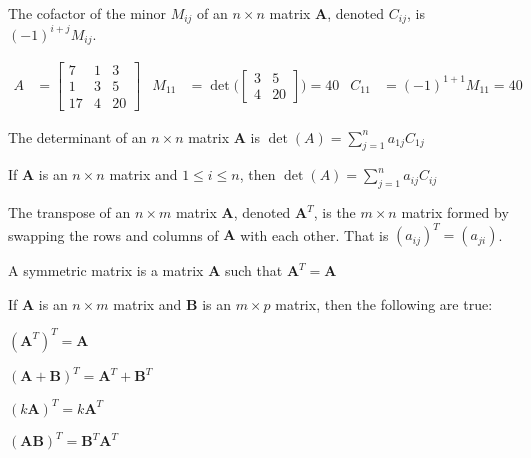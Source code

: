     \begin{definition}
        The cofactor of the minor $M_{ij}$ of an
        ${n}\times{n}$ matrix $\mathbf{A}$,
        denoted $C_{ij}$, is $(-1)^{i+j}M_{ij}$.
    \end{definition}
    \begin{example}
        \begin{align*}
            A&=
            \begin{bmatrix}
                7&1&3\\
                1&3&5\\
                17&4&20
            \end{bmatrix}
            &
            M_{11}
            &=
            \det\Bigg(\begin{bmatrix}
                     3&5\\
                     4&20
                 \end{bmatrix}
                \Bigg)
            =40
            &
            C_{11}
            &=(-1)^{1+1}M_{11}=40
        \end{align*}
    \end{example}
    \begin{definition}
        The determinant of an ${n}\times{n}$ matrix
        $\mathbf{A}$ is
        $\det(A)=\sum_{j=1}^{n}a_{1j}C_{1j}$
    \end{definition}
    \begin{theorem}
        If $\mathbf{A}$ is an ${n}\times{n}$ matrix
        and ${1}\leq{i}\leq{n}$, then
        $\det(A)=\sum_{j=1}^{n}a_{ij}C_{ij}$
    \end{theorem}
    \begin{definition}
        The transpose of an ${n}\times{m}$ matrix
        $\mathbf{A}$, denoted $\mathbf{A}^{T}$,
        is the ${m}\times{n}$ matrix formed by
        swapping the rows and columns of $\mathbf{A}$
        with each other. That is $(a_{ij})^{T}=(a_{ji})$.
    \end{definition}
    \begin{definition}
        A symmetric matrix is a matrix $\mathbf{A}$
        such that $\mathbf{A}^{T}=\mathbf{A}$
    \end{definition}
    \begin{theorem}
        If $\mathbf{A}$ is an ${n}\times{m}$ matrix and
        $\mathbf{B}$ is an ${m}\times{p}$ matrix, then
        the following are true:
        \begin{enumerate}
            \begin{multicols}{2}
                \item $(\mathbf{A}^{T})^{T}=\mathbf{A}$
                \item $(\mathbf{A}+\mathbf{B})^{T}%
                       =\mathbf{A}^{T}+\mathbf{B}^{T}$
                \item $(k\mathbf{A})^{T}=k\mathbf{A}^{T}$
                \item $(\mathbf{A}\mathbf{B})^{T}%
                       =\mathbf{B}^{T}\mathbf{A}^{T}$
            \end{multicols}
        \end{enumerate}
    \end{theorem}
